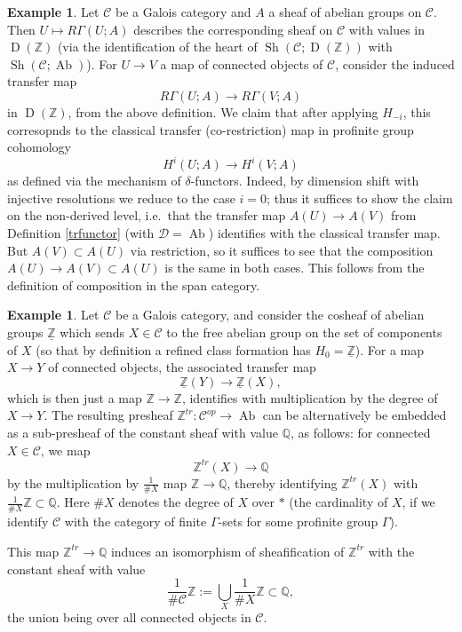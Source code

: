 \documentclass[12pt]{article}
\theoremstyle{definition}
\newtheorem{example}[theorem]{Example}
\newcommand{\on}{\operatorname}
\newcommand{\mc}{\mathcal}
\newcommand{\mbb}{\mathbb}
\newcommand{\ul}{\underline}
\begin{document}
\begin{example}
Let $\mc{C}$ be a Galois category and $A$ a sheaf of abelian groups on $\mc{C}$.  Then $U\mapsto R\Gamma(U;A)$ describes the corresponding sheaf on $\mc{C}$ with values in $\on{D}(\mbb{Z})$ (via the identification of the heart of $\on{Sh}(\mc{C};\on{D}(\mbb{Z}))$ with $\on{Sh}(\mc{C};\on{Ab})$).  For $U\to V$ a map of connected objects of $\mc{C}$, consider the induced transfer map
$$R\Gamma(U;A)\to R\Gamma(V;A)$$
in $\on{D}(\mbb{Z})$, from the above definition.  We claim that after applying $H_{-i}$, this corresopnds to the classical transfer (co-restriction) map in profinite group cohomology
$$H^i(U;A)\to H^i(V;A)$$
as defined via the mechanism of $\delta$-functors.  Indeed, by dimension shift with injective resolutions we reduce to the case $i=0$; thus it suffices to show the claim on the non-derived level, i.e.\ that the transfer map $A(U) \to A(V)$ from Definition \ref{trfunctor} (with $\mc{D}=\on{Ab}$) identifies with the classical transfer map.  But $A(V)\subset A(U)$ via restriction, so it suffices to see that the composition $A(U) \to A(V) \subset A(U)$ is the same in both cases.  This follows from the definition of composition in the span category.
\end{example}

\begin{example}\label{ztr}
Let $\mc{C}$ be a Galois category, and consider the cosheaf of abelian groups $\ul{\mbb{Z}}$ which sends $X\in\mc{C}$ to the free abelian group on the set of components of $X$ (so that by definition a refined class formation has $H_0=\ul{\mbb{Z}}$).  For a map $X \to Y$ of connected objects, the associated transfer map
$$\ul{\mbb{Z}}(Y)\rightarrow \ul{\mbb{Z}}(X),$$
which is then just a map $\mbb{Z} \to \mbb{Z}$,
identifies with multiplication by the degree of $X\to Y$.  The resulting presheaf $\mbb{Z}^{tr}:\mc{C}^{op}\to\on{Ab}$ can be alternatively be embedded as a sub-presheaf of the constant sheaf with value $\mbb{Q}$, as follows: for connected $X\in\mc{C}$, we map
$$\mbb{Z}^{tr}(X) \to \mbb{Q}$$
by the multiplication by $\frac{1}{\#X}$ map $\mbb{Z}\to \mbb{Q}$, thereby identifying $\mbb{Z}^{tr}(X)$ with $\frac{1}{\#X}\mbb{Z}\subset\mbb{Q}$.  Here $\#X$ denotes the degree of $X$ over $\ast$ (the cardinality of $X$, if we identify $\mc{C}$ with the category of finite $\Gamma$-sets for some profinite group $\Gamma$).

This map $\mbb{Z}^{tr}\to\mbb{Q}$ induces an isomorphism of sheafification of $\mbb{Z}^{tr}$ with the constant sheaf with value
$$\frac{1}{\#\mc{C}}\mbb{Z}:= \bigcup_{X} \frac{1}{\#X}\mbb{Z}\subset\mbb{Q},$$
the union being over all connected objects in $\mc{C}$.
\end{example}
\end{document}
